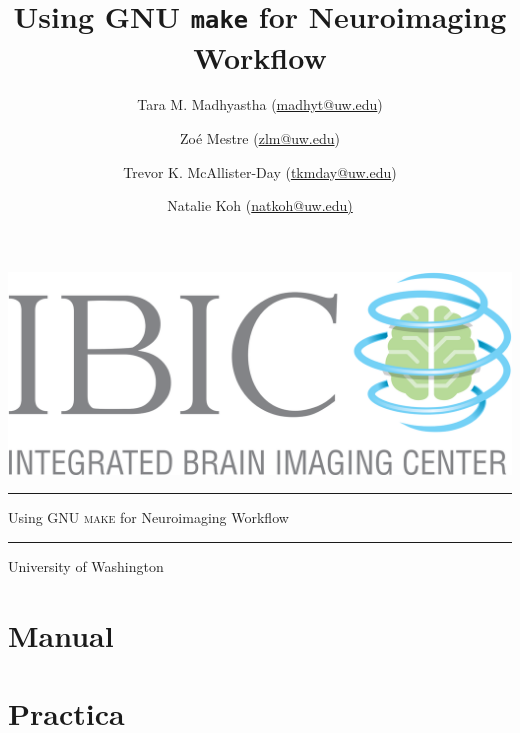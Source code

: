 \documentclass[oneside,11pt]{memoir}
\title{Using GNU \texttt{make} for Neuroimaging Workflow}
\author{ Tara M. Madhyastha (\url{madhyt@uw.edu}) \and Zo\'e Mestre (\url{zlm@uw.edu}) %
	\and Trevor K. McAllister-Day (\url{tkmday@uw.edu}) \and Natalie Koh (\url{natkoh@uw.edu)} %
}
\begin{document}
	
	
	\thispagestyle{empty}
	\begin{vplace}[0.7]
		\begin{center}
			\includegraphics[width=0.75\linewidth, natwidth=1890, natheight=761]{IBIClogo.png}				%
			\vspace{0.25in} \hrule \vspace{0.25in}															%
			{ \fontsize{30pt}{36pt} \selectfont Using GNU \textsc{make} for Neuroimaging Workflow\par }		%
			\vspace{0.25in} \hrule \vspace{0.25in}															%
			{\LARGE University of Washington} 																%
		\end{center}	
	\end{vplace}
	
	\frontmatter	%
	
	\maketitle		%
	
	\tableofcontents
	
	\listoffigures
	
	\mainmatter		%
	
	\part{Manual}
	
	
	
	
	\part{Practica}
	
\end{document}

